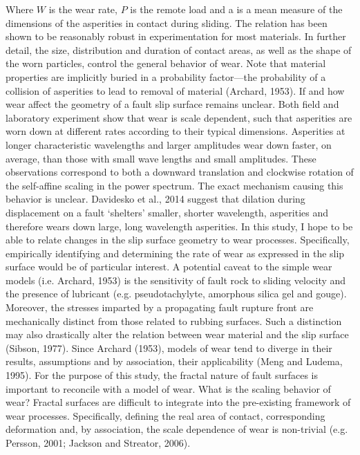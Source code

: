 \documentclass[12pt,a4paper]{article}
\begin{document}
Where $W$ is the wear rate, $P$ is the remote load and a is a mean measure of the dimensions of the asperities in contact during sliding. The relation has been shown to be reasonably robust in experimentation for most materials. In further detail, the size, distribution and duration of contact areas, as well as the shape of the worn particles, control the general behavior of wear. Note that material properties are implicitly buried in a probability factor—the probability of a collision of asperities to lead to removal of material (Archard, 1953).
If and how wear affect the geometry of a fault slip surface remains unclear. Both field and laboratory experiment show that wear is scale dependent, such that asperities are worn down at different rates according to their typical dimensions. Asperities at longer characteristic wavelengths and larger amplitudes wear down faster, on average, than those with small wave lengths and small amplitudes. These observations correspond to both a downward translation and clockwise rotation of the self-affine scaling in the power spectrum. The exact mechanism causing this behavior is unclear. Davidesko et al., 2014 suggest that dilation during displacement on a fault ‘shelters’ smaller, shorter wavelength, asperities and therefore wears down large, long wavelength asperities. In this study, I hope to be able to relate changes in the slip surface geometry to wear processes. Specifically, empirically identifying and determining the rate of wear as expressed in the slip surface would be of particular interest.
A potential caveat to the simple wear models (i.e. Archard, 1953) is the sensitivity of fault rock to sliding velocity and the presence of lubricant (e.g. pseudotachylyte, amorphous silica gel and gouge). Moreover, the stresses imparted by a propagating fault rupture front are mechanically distinct from those related to rubbing surfaces. Such a distinction may also drastically alter the relation between wear material and the slip surface (Sibson, 1977). Since Archard (1953), models of wear tend to diverge in their results, assumptions and by association, their applicability (Meng and Ludema, 1995).  For the purpose of this study, the fractal nature of fault surfaces is important to reconcile with a model of wear. What is the scaling behavior of wear? Fractal surfaces are difficult to integrate into the pre-existing framework of wear processes. Specifically, defining the real area of contact, corresponding deformation and, by association, the scale dependence of wear is non-trivial (e.g. Persson, 2001; Jackson and Streator, 2006).
\end{document}
